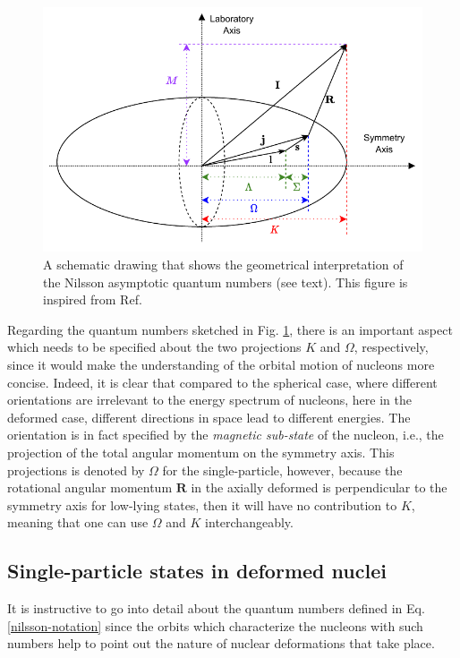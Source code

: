 \begin{figure}
    \centering
    \includegraphics[scale=1]{Chapters/Figures/nilsson_quantum_numbers.pdf}
    \caption{A schematic drawing that shows the geometrical interpretation of the Nilsson asymptotic quantum numbers (see text). This figure is inspired from Ref. \cite{garnsworthy2007neutron}}
    \label{fig-nilsson-quantum-numbers}
\end{figure}

Regarding the quantum numbers sketched in Fig. \ref{fig-nilsson-quantum-numbers}, there is an important aspect which needs to be specified about the two projections $K$ and $\Omega$, respectively, since it would make the understanding of the orbital motion of nucleons more concise. Indeed, it is clear that compared to the spherical case, where different orientations are irrelevant to the energy spectrum of nucleons, here in the deformed case, different directions in space lead to different energies. The orientation is in fact specified by the \emph{magnetic sub-state} of the nucleon, i.e., the projection of the total angular momentum on the symmetry axis. This projections is denoted by $\Omega$ for the single-particle, however, because the rotational angular momentum $\mathbf{R}$ in the axially deformed is perpendicular to the symmetry axis for low-lying states, then it will have no contribution to $K$, meaning that one can use $\Omega$ and $K$ interchangeably.

\subsection{Single-particle states in deformed nuclei}

It is instructive to go into detail about the quantum numbers defined in Eq. \ref{nilsson-notation} since the orbits which characterize the nucleons with such numbers help to point out the nature of nuclear deformations that take place.


